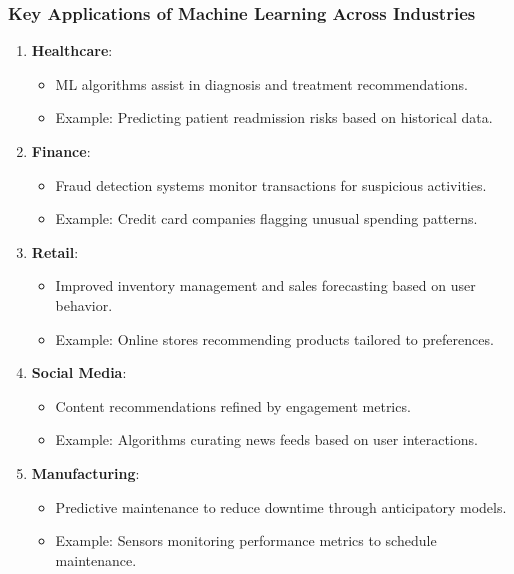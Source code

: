 \documentclass[aspectratio=169]{beamer}
\begin{document}
\begin{frame}[fragile]
    \frametitle{Key Applications of Machine Learning Across Industries}
    \begin{enumerate}
        \item \textbf{Healthcare}:
            \begin{itemize}
                \item ML algorithms assist in diagnosis and treatment recommendations.
                \item Example: Predicting patient readmission risks based on historical data.
            \end{itemize}
        \item \textbf{Finance}:
            \begin{itemize}
                \item Fraud detection systems monitor transactions for suspicious activities.
                \item Example: Credit card companies flagging unusual spending patterns.
            \end{itemize}
        \item \textbf{Retail}:
            \begin{itemize}
                \item Improved inventory management and sales forecasting based on user behavior.
                \item Example: Online stores recommending products tailored to preferences.
            \end{itemize}
        \item \textbf{Social Media}:
            \begin{itemize}
                \item Content recommendations refined by engagement metrics.
                \item Example: Algorithms curating news feeds based on user interactions.
            \end{itemize}
        \item \textbf{Manufacturing}:
            \begin{itemize}
                \item Predictive maintenance to reduce downtime through anticipatory models.
                \item Example: Sensors monitoring performance metrics to schedule maintenance.
            \end{itemize}
    \end{enumerate}
\end{frame}
\end{document}
